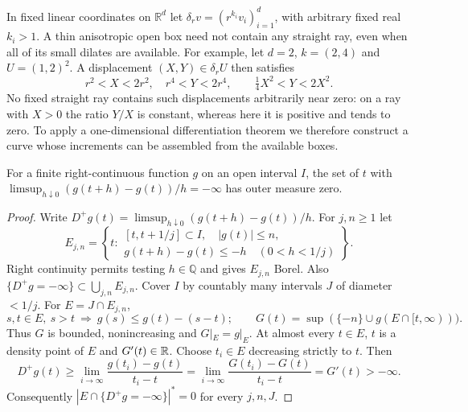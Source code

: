 In fixed linear coordinates on $\mathbb R^d$ let
$\delta_r v=(r^{k_i}v_i)_{i=1}^d$, with arbitrary fixed real
$k_i>1$. A thin anisotropic open box need not contain any straight
ray, even when all of its small dilates are available. For example, let
$d=2$, $k=(2,4)$ and $U=(1,2)^2$. A displacement $(X,Y)\in\delta_r U$
then satisfies
\[
 r^2<X<2r^2,\quad r^4<Y<2r^4,\qquad
 \tfrac14 X^2<Y<2X^2 .
\]
No fixed straight ray contains such displacements arbitrarily near zero:
on a ray with $X>0$ the ratio $Y/X$ is constant, whereas here it is
positive and tends to zero. To apply a one-dimensional differentiation
theorem we therefore construct a curve whose increments can be assembled
from the available boxes.

\begin{lemma}\label{one-sided}
For a finite right-continuous function $g$ on an open interval $I$,
the set of $t$ with
$\limsup_{h\downarrow0}(g(t+h)-g(t))/h=-\infty$ has outer measure zero.
\end{lemma}
\begin{proof}
Write $D^+g(t)=\limsup_{h\downarrow0}(g(t+h)-g(t))/h$. For $j,n\ge1$ let
\[
 E_{j,n}=\left\{t:
 \begin{array}{l}
 [t,t+1/j]\subset I,\quad |g(t)|\le n,\\
 g(t+h)-g(t)\le-h\quad(0<h<1/j)
 \end{array}\right\}.
\]
Right continuity permits testing $h\in\mathbb Q$ and gives
$E_{j,n}$ Borel. Also $\{D^+g=-\infty\}\subset\bigcup_{j,n}E_{j,n}$.
Cover $I$ by countably many intervals $J$ of diameter $<1/j$. For $E=J\cap E_{j,n}$,
\[
 s,t\in E,\ s>t\ \Longrightarrow\ g(s)\le g(t)-(s-t);
 \qquad G(t)=\sup(\{-n\}\cup g(E\cap[t,\infty))).
\]
Thus $G$ is bounded, nonincreasing and $G|_E=g|_E$. At almost every
$t\in E$, $t$ is a density point of $E$ and $G'(t)\in\mathbb R$. Choose
$t_i\in E$ decreasing strictly to $t$. Then
\[
 D^+g(t)\ge\lim_{i\to\infty}\frac{g(t_i)-g(t)}{t_i-t}
       =\lim_{i\to\infty}\frac{G(t_i)-G(t)}{t_i-t}=G'(t)>-\infty .
\]
Consequently $|E\cap\{D^+g=-\infty\}|^*=0$ for every $j,n,J$.
\end{proof}


